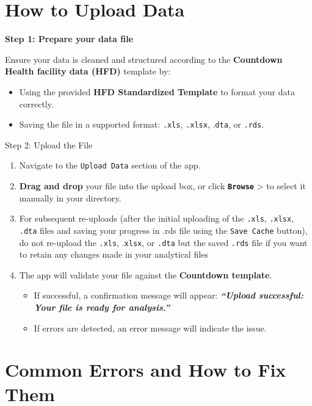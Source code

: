 \documentclass[
  english,
  letterpaper,
  DIV=11,
  numbers=noendperiod]{scrreprt}
\begin{document}
\section{\texorpdfstring{\textbf{How to Upload
Data}}{How to Upload Data}}\label{how-to-upload-data}

\textbf{Step 1: Prepare your data file}

Ensure your data is cleaned and structured according to the
\textbf{Countdown Health facility data (HFD)} template by:

\begin{itemize}
\item
  Using the provided \textbf{HFD Standardized Template} to format your
  data correctly.
\item
  Saving the file in a supported format: \texttt{.xls}, \texttt{.xlsx},
  .\texttt{dta}, or \texttt{.rds}.
\end{itemize}

Step 2: Upload the File

\begin{enumerate}
\def\labelenumi{\arabic{enumi}.}
\item
  Navigate to the \texttt{Upload\ Data} section of the app.
\item
  \textbf{Drag and drop} your file into the upload box, or click
  \textbf{\texttt{Browse}} \textgreater{} to select it manually in your
  directory.
\item
  For subsequent re-uploads (after the initial uploading of the
  \texttt{.xls}, \texttt{.xlsx}, \texttt{.dta} files and saving your
  progress in .rds file using the \texttt{Save\ Cache} button), do not
  re-upload the \texttt{.xls}, .\texttt{xlsx}, or \texttt{.dta} but the
  saved \texttt{.rds} file if you want to retain any changes made in
  your analytical files
\item
  The app will validate your file against the \textbf{Countdown
  template}.

  \begin{itemize}
  \item
    If successful, a confirmation message will appear:
    \textbf{\emph{``Upload successful: Your file is ready for
    analysis.''}}
  \item
    If errors are detected, an error message will indicate the issue.
  \end{itemize}
\end{enumerate}

\section{\texorpdfstring{\textbf{Common Errors and How to Fix
Them}}{Common Errors and How to Fix Them}}\label{common-errors-and-how-to-fix-them}
\end{document}
